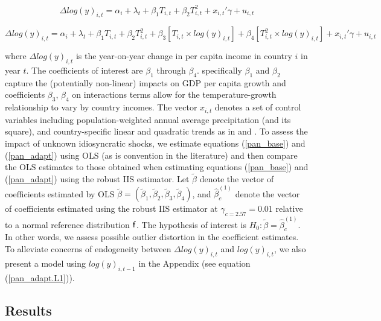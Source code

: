 \documentclass[11pt, letterpaper]{article}
\numberwithin{algorithm}{section}
\numberwithin{assumption}{section}
\numberwithin{lemma}{section}
\numberwithin{theorem}{section}
\numberwithin{corollary}{section}
\numberwithin{remark}{section}
\numberwithin{equation}{section}
\numberwithin{figure}{section}
\numberwithin{table}{section}
\begin{document}
\begin{small}
\begin{equation}
\label{pan_base}
\Delta log(y)_{i,t} = \alpha_i + \lambda_t + \beta_1 T_{i,t} + \beta_2 T^2_{i,t} + x_{i,t}'\gamma + u_{i,t}
\end{equation}
\end{small}


\begin{small}
\begin{equation}
\label{pan_adapt}
\Delta log(y)_{i,t} = \alpha_i + \lambda_t + \beta_1 T_{i,t} + \beta_2 T^2_{i,t} + \beta_3 \left[ T_{i,t} \times  log(y)_{i, t} \right] + \beta_4 \left[  T^2_{i,t} \times  log(y)_{i, t} \right] + x_{i,t}'\gamma + u_{i,t}
\end{equation}
\end{small}

where $\Delta log(y)_{i,t}$ is the year-on-year change in per capita income in country $i$ in year $t$. The coefficients of interest are $\beta_1$ through $\beta_4$. specifically $\beta_1$ and $\beta_2$ capture the (potentially non-linear) impacts on GDP per capita growth and coefficients $\beta_3$, $\beta_4$ on interactions terms allow for the temperature-growth relationship to vary by country incomes. The vector $x_{i,t}$ denotes a set of control variables including population-weighted annual average precipitation (and its square), and country-specific linear and quadratic trends as in \citet{burke2015global} and \citet{pretis2018uncertain}. To assess the impact of unknown idiosyncratic shocks, we estimate equations (\ref{pan_base}) and (\ref{pan_adapt}) using OLS (as is convention in the literature) and then compare the OLS estimates to those obtained when estimating equations (\ref{pan_base}) and (\ref{pan_adapt}) using the robust IIS estimator. Let $\tilde{\beta}$ denote the vector of coefficients estimated by OLS $\tilde{\beta}=(\tilde{\beta}_1, \tilde{\beta}_2, \tilde{\beta}_3, \tilde{\beta}_4)$, and $\hat{\beta}^{( 1)}_{c}$ denote the vector of coefficients estimated using the robust IIS estimator at $\gamma_{c=2.57}=0.01$ relative to a normal reference distribution ${\sf f}$. The hypothesis of interest is $H_0: \tilde{\beta} = \hat{\beta}^{( 1)}_{c}$. In other words, we assess possible outlier distortion in the coefficient estimates. To alleviate concerns of endogeneity between $\Delta log(y)_{i,t}$ and $log(y)_{i, t}$, we also present a model using $log(y)_{i, t-1}$ in the Appendix (see equation (\ref{pan_adapt.L1})).

\subsection{Results}
\end{document}
